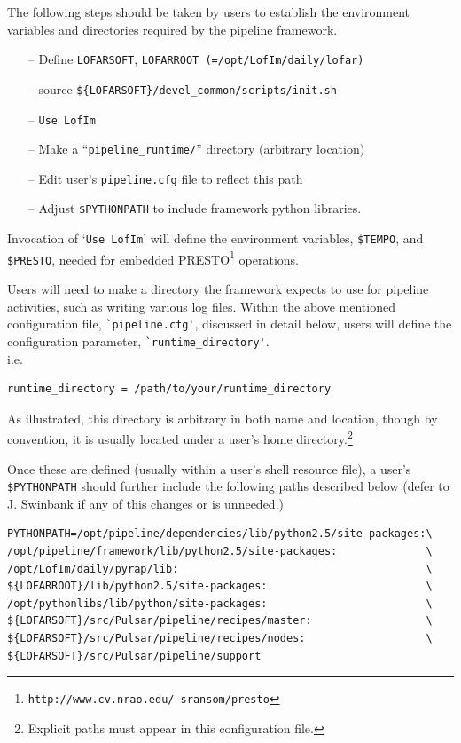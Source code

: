 \documentclass[a4paper,10pt,bibtotoc]{scrartcl}
\begin{document}
The following steps should be taken by users to establish the
environment  variables and directories required by the pipeline framework.
\begin{itemize}
\item[--] Define \verb|LOFARSOFT|, \verb|LOFARROOT (=/opt/LofIm/daily/lofar)|
\item [--]source \verb|${LOFARSOFT}/devel_common/scripts/init.sh|
\item [--]\verb|Use LofIm|
\item[--] Make a ``\verb|pipeline_runtime/|'' directory (arbitrary location)
\item[--] Edit user's \verb|pipeline.cfg| file to reflect this path
\item[--] Adjust \verb|$PYTHONPATH| to include framework python
  libraries.
\end{itemize}
Invocation of `\verb|Use LofIm|' will define the environment variables, \verb|$TEMPO|,
and \verb|$PRESTO|, needed for embedded
PRESTO\footnote{\texttt{http://www.cv.nrao.edu/-sransom/presto}} operations.

Users will need to make a directory the framework expects to use for
pipeline activities, such as writing various log files. Within the
above mentioned  configuration file, \verb|`pipeline.cfg'|, discussed in detail below,
users will define the configuration parameter, \verb|`runtime_directory'|.\\
i.e. 
\begin{verbatim}
runtime_directory = /path/to/your/runtime_directory
\end{verbatim}

As illustrated, this directory is arbitrary in both name and location,
though by convention, it is usually located under a user's home
directory.\footnote{Explicit paths must appear in this configuration file.}

Once these are defined (usually within a user's shell resource file),
a user's \verb|$PYTHONPATH| should further include the following paths
described below (defer to J. Swinbank if any of this changes or is unneeded.)

\begin{verbatim}
PYTHONPATH=/opt/pipeline/dependencies/lib/python2.5/site-packages:\
/opt/pipeline/framework/lib/python2.5/site-packages:              \ 
/opt/LofIm/daily/pyrap/lib:                                       \
${LOFARROOT}/lib/python2.5/site-packages:                         \
/opt/pythonlibs/lib/python/site-packages:                         \
${LOFARSOFT}/src/Pulsar/pipeline/recipes/master:                  \
${LOFARSOFT}/src/Pulsar/pipeline/recipes/nodes:                   \
${LOFARSOFT}/src/Pulsar/pipeline/support 
\end{verbatim}
\end{document}
